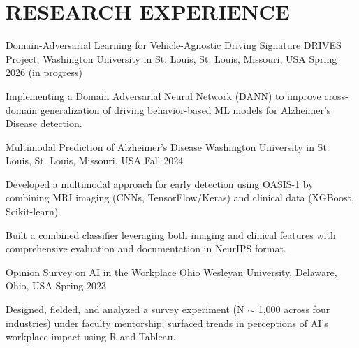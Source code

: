 \documentclass[10pt, letterpaper]{article}
\begin{document}
\vspace{\headerSpacing}

\section{RESEARCH EXPERIENCE}

\vspace{\entrySpacing}
\begin{experienceentry}
  {Domain-Adversarial Learning for Vehicle-Agnostic Driving Signature} %
  {DRIVES Project, Washington University in St. Louis, St. Louis, Missouri, USA} %
  {Spring 2026 (in progress)} %
  \item Implementing a Domain Adversarial Neural Network (DANN) to improve cross-domain generalization of driving behavior-based ML models for Alzheimer's Disease detection.
\end{experienceentry}

\vspace{\entrySpacing}
\begin{experienceentry}
  {Multimodal Prediction of Alzheimer's Disease} %
  {Washington University in St. Louis, St. Louis, Missouri, USA} %
  {Fall 2024} %
  \item Developed a multimodal approach for early detection using OASIS-1 by combining MRI imaging (CNNs, TensorFlow/Keras) and clinical data (XGBoost, Scikit-learn).
  \item Built a combined classifier leveraging both imaging and clinical features with comprehensive evaluation and documentation in NeurIPS format.
\end{experienceentry}

\vspace{\entrySpacing}
\begin{experienceentry}
  {Opinion Survey on AI in the Workplace} %
  {Ohio Wesleyan University, Delaware, Ohio, USA} %
  {Spring 2023} %
  \item Designed, fielded, and analyzed a survey experiment (N $\sim$ 1{,}000 across four industries) under faculty mentorship; surfaced trends in perceptions of AI's workplace impact using R and Tableau.
\end{experienceentry}
\end{document}
